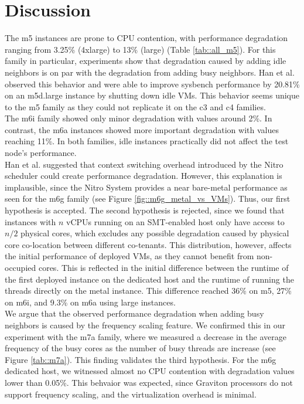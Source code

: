 \section{Discussion}
The m5 instances are prone to CPU contention, with performance degradation
ranging from 3.25\% (4xlarge) to 13\% (large) (Table \ref{tab::all_m5}). 
For this family in particular, experiments show that degradation caused by adding idle neighbors is on par
with the degradation from adding busy neighbors. Han et al. \cite{characterizing_public} 
observed this behavior and were able to improve sysbench performance by 20.81\% 
on an m5d.large instance by shutting down idle VMs. This behavior seems unique to the m5 family as 
they could not replicate it on the c3 and c4 families. \\ 
The m6i family showed only minor degradation with values around 2\%. In contrast, the m6a instances 
showed more important degradation with values reaching 11\%. In both families, 
idle instances practically did not affect the test node's performance. \\
Han et al. \cite{characterizing_public} suggested that context switching overhead introduced
by the Nitro scheduler could create performance degradation.
However, this explanation is implausible, since the Nitro System provides a near bare-metal 
performance as seen for the m6g family (see Figure \ref{fig::m6g_metal_vs_VMs}). 
Thus, our first hypothesis is accepted. 
The second hypothesis is rejected, since we found that instances with $n$ vCPUs running on an SMT-enabled host only have 
access to $n/2$ physical cores, which excludes any possible degradation caused by physical core 
co-location between different co-tenants. This distribution, however,  affects the initial performance 
of deployed VMs, as they cannot benefit from non-occupied cores. This is reflected in the initial 
difference between the runtime of the first deployed instance on the dedicated host and the runtime 
of running the threads directly on the metal instance. This difference reached 36\% on m5, 27\% on m6i, 
and 9.3\% on m6a using large instances. \\
We argue that the observed performance degradation when adding busy neighbors is caused 
by the frequency scaling feature. We confirmed this in our experiment with the m7a family, 
where we measured a decrease in the average frequency of the busy cores as the number of busy 
threads are increase (see Figure \ref{tab::m7a}). This finding validates the third hypothesis. 
For the m6g dedicated host, we witnessed almost no CPU contention with degradation 
values lower than 0.05\%. This behvaior was expected, since Graviton processors do not support frequency
scaling, and the virtualization overhead is minimal.
